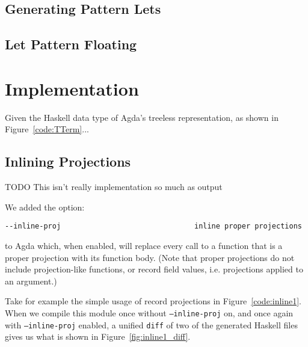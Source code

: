 \subsection{Generating Pattern Lets}

\subsection{Let Pattern Floating}

\section{Implementation}
\label{sec:implementation}

Given the Haskell data type of Agda's treeless representation, as shown in Figure~\ref{code:TTerm}...

\subsection{Inlining Projections}

TODO This isn't really implementation so much as output

We added the option:

\begin{verbatim}
--inline-proj                               inline proper projections
\end{verbatim}

to Agda which, when enabled, will replace every call to a function that is a proper projection with its function body. (Note that proper projections do not include projection-like functions, or record field values, i.e. projections applied to an argument.)



Take for example the simple usage of record projections in Figure~\ref{code:inline1}. When we compile this module once without \texttt{--inline-proj} on, and once again with \texttt{--inline-proj} enabled, a unified \texttt{diff} of two of the generated Haskell files gives us what is shown in Figure~\ref{fig:inline1_diff}.

